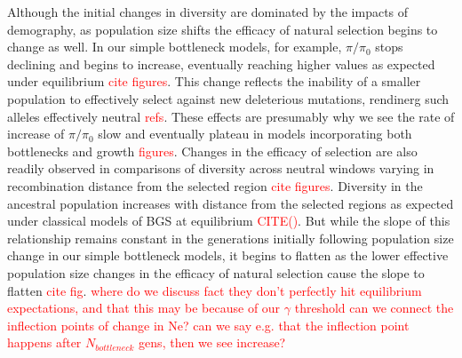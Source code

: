 \documentclass[9pt,twocolumn,twoside]{rilabRxiv}
\newcommand{\jri}[1]{{\small \textcolor{red}{#1}}}
\newcommand{\citex}[1]{{\small \textcolor{red}{CITE(#1)}}}
\begin{document}
Although the initial changes in diversity are dominated by the impacts of demography, as population size shifts the efficacy of natural selection begins to change as well.
In our simple bottleneck models, for example,  $\pi/\pi_0$ stops declining and begins to increase, eventually reaching higher values as expected under equilibrium \jri{cite figures}.
This change reflects the inability of a smaller population to effectively select against new deleterious mutations, rendinerg such alleles effectively neutral \jri{refs}.
These effects are presumably why we see the rate of increase of $\pi/\pi_0$ slow and eventually plateau in models incorporating both bottlenecks and growth \jri{figures}.
Changes in the efficacy of selection are also readily observed in comparisons of diversity across neutral windows varying in recombination distance from the selected region \jri{cite figures}.
Diversity in the ancestral population increases with  distance from the selected regions as expected under classical models of BGS at equilibrium \citex{}. 
But while the slope of this relationship remains constant in the generations initially following population size change in our simple bottleneck models, it begins to flatten as the lower effective population size changes in the efficacy of natural selection cause the slope to flatten  \jri{cite fig}.
\jri{where do we discuss fact they don't perfectly hit equilibrium expectations, and that this may be because of our $\gamma$ threshold}
\jri{can we connect the inflection points of change in Ne? can we say e.g. that the inflection point happens after $N_{bottleneck}$ gens, then we see increase?}
\end{document}
